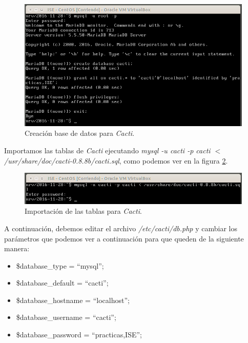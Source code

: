 \documentclass[a4paper,titlepage,12pt]{report}	%
\numberwithin{figure}{section} %
\numberwithin{table}{section} %
\begin{document}
	\begin{figure}[H]
	   \includegraphics[width=\linewidth]{./Imagenes/P3/O5-2.png}
	   \vspace{-0.5cm}
	   \caption[Creación base de datos para \textit{Cacti}.]{Creación base de datos para \textit{Cacti}.}
	   \label{P3-O5-2}
	\end{figure}

	Importamos las tablas de \textit{Cacti} ejecutando \textit{mysql -u cacti -p cacti $<$ /usr/share/doc/cacti-0.8.8b/cacti.sql}, como podemos ver en la figura \ref{P3-O5-3}.

	\begin{figure}[H]
	   \includegraphics[width=\linewidth]{./Imagenes/P3/O5-3.png}
	   \vspace{-0.5cm}
	   \caption[Importación de las tablas para \textit{Cacti}.]{Importación de las tablas para \textit{Cacti}.}
	   \label{P3-O5-3}
	\end{figure}

	A continuación, debemos editar el archivo \textit{/etc/cacti/db.php} y cambiar los parámetros que podemos ver a continuación para que queden de la siguiente manera:
	\begin{itemize}
	   \item \$database\_type = ``mysql'';
	   \item \$database\_default = ``cacti'';
	   \item \$database\_hostname = ``localhost'';
	   \item \$database\_username = ``cacti'';
	   \item \$database\_password = ``practicas,ISE'';
	\end{itemize}
\end{document}
